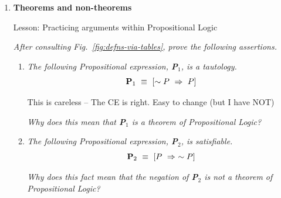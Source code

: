 {\begin{enumerate}
\begin{enumerate}
{\em Hint:}
\begin{itemize}
\item
As you create a new string of numbers, in how many ways can you choose {\em the first number}? {\em the second number}? \ldots
\medskip\item
Based on your answers for the first and second and third numbers of the new string, in how many ways can you choose {\em the first two numbers---i.e., the first {\em pair} of numbers}? {\em the next two numbers}? \ldots
\end{itemize}
  \medskip\item
{\em Strengthen your argument by listing all permutations of  $S' =  \{1,2,3,4,5\}$.}

\smallskip

Write small---there are a lot of permutations.
  \medskip\item
$\oplus \oplus$ {\em Extrapolate from your argument to determine the number of permutations of the set $S" =  \{1,2,3, \ldots, n\}$, as a function of $n$.}
  \end{enumerate}  

\medskip\item
{\bf Theorems and non-theorems}

{\sc Lesson:} Practicing arguments within Propositional Logic

\smallskip

{\em
After consulting Fig.~\ref{fig:defns-via-tables}, prove the following assertions.}

\smallskip

\begin{enumerate}
\item
{\em The following Propositional expression, {\bf P}$_1$, is a tautology.}
\[ {\bf P}_1 \ \equiv \ \left[ \sim P \ \Rightarrow \ P \right] \]

{\Arny This is careless -- The CE is right.  Easy to change (but I have NOT)}


\smallskip

{\em Why does this mean that {\bf P}$_1$ is a {\em theorem} of Propositional Logic?}

\medskip\item
{\em The following Propositional expression, {\bf P}$_2$, is satisfiable.}
\[ {\bf P}_2 \ \equiv \ \left[ P \ \Rightarrow \ \sim P \right] \]

\smallskip

{\em Why does this fact mean that the {\em negation} of {\bf P}$_2$ is {\em not a theorem} of Propositional Logic?}
\end{enumerate}


\end{enumerate}}
